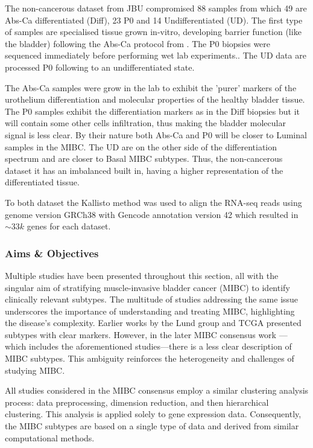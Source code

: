 The non-cancerous dataset from JBU compromised 88 samples from which 49 are Abs-Ca differentiated (Diff), 23 P0 and 14 Undifferentiated (UD). The first type of samples are specialised tissue grown in-vitro, developing barrier function (like the bladder) following the Abs-Ca protocol from \cite{Cross2005-fe}. The P0 biopsies were sequenced immediately before performing wet lab experiments.. The UD data are processed P0 following \cite{Cross2005-fe} to an undifferentiated state. 

The Abs-Ca samples were grow in the lab to exhibit the 'purer' markers of the urothelium differentiation and molecular properties of the healthy bladder tissue. The P0 samples exhibit the differentiation markers as in the Diff biopsies but it will contain some other cells infiltration, thus making the bladder molecular signal is less clear. By their nature both Abs-Ca and P0 will be closer to Luminal samples in the MIBC. The UD are on the other side of the differentiation spectrum and are closer to Basal MIBC subtypes. Thus, the non-cancerous dataset it has an imbalanced built in, having a higher representation of the differentiated tissue. 

To both dataset the Kallisto method was used to align the RNA-seq reads using genome version GRCh38 with Gencode annotation version 42 which resulted in $\sim33k$ genes for each dataset.


\subsubsection{Aims \& Objectives} \label{s:lit:aims_objs}

Multiple studies have been presented throughout this section, all with the singular aim of stratifying muscle-invasive bladder cancer (MIBC) to identify clinically relevant subtypes. The multitude of studies addressing the same issue underscores the importance of understanding and treating MIBC, highlighting the disease's complexity. Earlier works by the Lund group \cite{Sjodahl2017-xr, Marzouka2018-ge} and TCGA \cite{Tcga2014-dr, Robertson2017-mg} presented subtypes with clear markers. However, in the later MIBC consensus work \cite{Kamoun2020-tj}—which includes the aforementioned studies—there is a less clear description of MIBC subtypes. This ambiguity reinforces the heterogeneity and challenges of studying MIBC.

All studies considered in the MIBC consensus employ a similar clustering analysis process: data preprocessing, dimension reduction, and then hierarchical clustering. This analysis is applied solely to gene expression data. Consequently, the MIBC subtypes are based on a single type of data and derived from similar computational methods.

